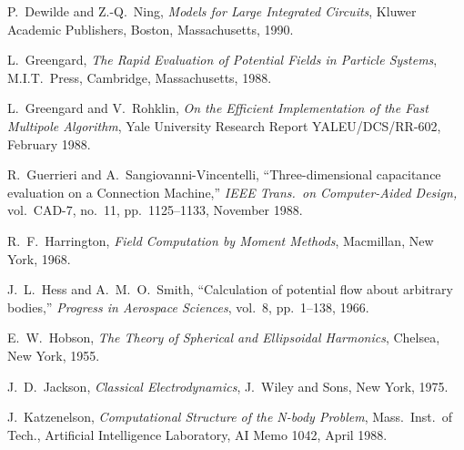 \begin{thebibliography}{[xx]} 

P.\ Dewilde and Z.-Q.\ Ning, {\em Models for Large Integrated Circuits},
Kluwer Academic Publishers, Boston, Massachusetts, 1990.



L.\ Greengard, {\em The Rapid Evaluation of Potential Fields in Particle
Systems}, M.I.T.\ Press, Cambridge, Massachusetts, 1988.

L.\ Greengard and V.\ Rohklin, {\em On the Efficient Implementation of the Fast
Multipole Algorithm},
Yale University Research Report YALEU/DCS/RR-602, February 1988.

R.\ Guerrieri and A.\ Sangiovanni-Vincentelli,
``Three-dimensional capacitance evaluation on a Connection Machine,''
{\em IEEE Trans.\ on Computer-Aided Design,} vol.\ CAD-7, no.\ 11, 
pp.\ 1125--1133, November 1988.


R.\ F.\ Harrington, {\em Field Computation by Moment Methods},
Macmillan, New York, 1968.

J.\ L.\ Hess and A.\ M.\ O.\ Smith, 
``Calculation of potential flow about arbitrary bodies,''
{\em Progress in Aerospace Sciences}, vol.\ 8, pp.\ 1--138, 1966.

E.\ W.\ Hobson, {\em The Theory of Spherical and Ellipsoidal Harmonics},
Chelsea, New York, 1955.

J.\ D.\ Jackson, {\em Classical Electrodynamics}, 
J.\ Wiley and Sons, New York, 1975.

J.\ Katzenelson, {\em Computational Structure of the N-body Problem},
Mass.\ Inst.\ of Tech., Artificial Intelligence Laboratory, AI Memo 1042,
April 1988.


\end{thebibliography}
